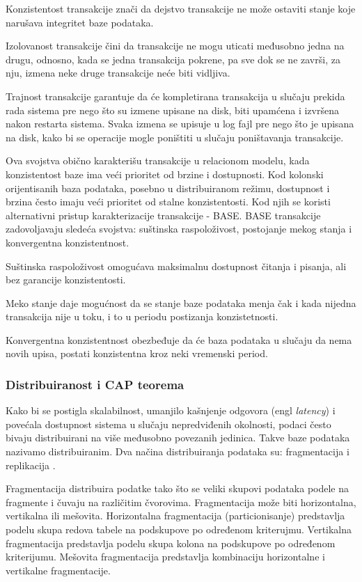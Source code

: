 \documentclass[12pt,oneside]{memoir}
\begin{document}
Konzistentost transakcije znači da dejstvo transakcije ne može ostaviti stanje koje narušava integritet baze podataka.

Izolovanost transakcije čini da transakcije ne mogu uticati međusobno jedna na drugu, odnosno, kada se jedna transakcija pokrene, pa sve dok se ne završi, za nju, izmena neke druge transakcije neće biti vidljiva.

Trajnost transakcije garantuje da će kompletirana transakcija u slučaju prekida rada sistema pre nego što su izmene upisane na disk, biti upamćena i izvršena nakon restarta sistema. Svaka izmena se upisuje u log fajl pre nego što je upisana na disk, kako bi se operacije mogle poništiti u slučaju poništavanja transakcije.

Ova svojstva obično karakterišu transakcije u relacionom modelu, kada konzistentost baze ima veći prioritet od brzine i dostupnosti. Kod kolonski orijentisanih baza podataka, posebno u distribuiranom režimu, dostupnost i brzina često imaju veći prioritet od stalne konzistentosti. Kod njih se koristi alternativni pristup karakterizacije transakcije - BASE. BASE transakcije zadovoljavaju sledeća svojstva: suštinska raspoloživost, postojanje mekog stanja i konvergentna konzistentnost.

Suštinska raspoloživost omogućava maksimalnu dostupnost čitanja i pisanja, ali bez garancije konzistentosti.

Meko stanje daje mogućnost da se stanje baze podataka menja čak i kada nijedna transakcija nije u toku, i to u periodu postizanja konzistetnosti.

Konvergentna konzistentnost obezbeđuje da će baza podataka u slučaju da nema novih upisa, postati konzistentna kroz neki vremenski period. 

\subsubsection{Distribuiranost i CAP teorema}

Kako bi se postigla skalabilnost, umanjilo kašnjenje odgovora (engl \textit{latency}) i povećala dostupnost sistema u slučaju nepredviđenih okolnosti, podaci često bivaju distribuirani na više međusobno povezanih jedinica. Takve baze podataka nazivamo distribuiranim.
Dva načina distribuiranja podataka su: fragmentacija i replikacija \cite{URBP}. 

Fragmentacija distribuira podatke tako što se veliki skupovi podataka podele na fragmente i čuvaju na različitim čvorovima. Fragmentacija može biti horizontalna, vertikalna ili mešovita. Horizontalna fragmentacija (particionisanje) predstavlja podelu skupa redova tabele na podskupove po određenom kriterujmu. Vertikalna fragmentacija predstavlja podelu skupa kolona na podskupove po određenom kriterijumu.  Mešovita fragmentacija predstavlja kombinaciju horizontalne i vertikalne fragmentacije.
\end{document}
